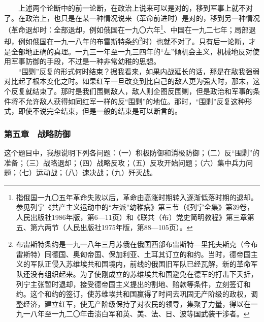 \documentclass[cn,11pt,chinese]{elegantbook}
\def\myformat#1{\hfil\hfil #1}
\begin{document}
　　上述两个论断中的前一论断，在政治上说来可以是对的，移到军事上就不对了。在政治上，也只是在某一种情况说来（革命前进时）是对的，移到另一种情况（革命退却时：全部退却，例如俄国在一九〇六年\footnote[22]{ 指俄国一九〇五年革命失败以后，革命由高涨时期转入逐渐低落时期的退却。参见列宁《共产主义运动中的“左派”幼稚病》第三节（《列宁全集》第39卷，人民出版社1986年版，第6—11页）和《联共（布）党史简明教程》第三章第五、第六两节（人民出版社1975年版，第88—105页）。}、中国在一九二七年；局部退却，例如俄国在一九一八年的布雷斯特条约\footnote[23]{ 布雷斯特条约是一九一八年三月苏俄在俄国西部布雷斯特—里托夫斯克（今布雷斯特）同德国、奥匈帝国、保加利亚、土耳其订立的和约。当时，德帝国主义的军队正侵入苏维埃共和国境内，前线的俄国旧军队已经瓦解，新的革命军队还没有组织起来。为了使刚成立的苏维埃共和国避免在德军的打击下夭折，列宁主张暂时退却，接受德帝国主义提出的割地、赔款等条件，立刻签订和约。这个和约的签订，使苏维埃共和国赢得了时间去巩固无产阶级的政权，调整经济，建立红军，使无产阶级保持了对农民的领导，集聚了力量，得以在一九一八年至一九二〇年击溃白军和英、美、法、日、波等国武装干涉者。}时）也就不对了。只有后一论断，才是全部地正确的真理。一九三一年至一九三四年的“左”倾机会主义，机械地反对使用军事防御的手段，不过是一种非常幼稚的思想。\\
　　“围剿”反复的形式何时结束？据我看来，如果内战延长的话，那是在敌我强弱对比起了根本变化之时。如果红军一旦改变到比自己的敌人更为强大时，那末，这个反复就结束了。那时是我们围剿敌人，敌人则企图反围剿，但是政治和军事的条件将不允许敌人获得如同红军一样的反“围剿”的地位。那时，“围剿”反复这种形式，即使不说完全结束，但是一般的结束是可以断言的。\\
\subsubsection*{\myformat{第五章　战略防御}}
这个题目中，我想说明下列各问题：（一）积极防御和消极防御；（二）反“围剿”的准备；（三）战略退却；（四）战略反攻；（五）反攻开始问题；（六）集中兵力问题；（七）运动战；（八）速决战；（九）歼灭战。\\
\end{document}
